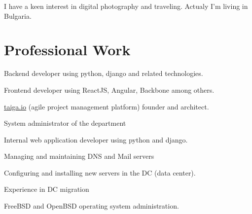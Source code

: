 \documentclass[letterpaper]{cv} %
\begin{document}
\sectionspace

I have a keen interest in digital photography and traveling. Actualy I'm
living in Bulgaria.


\sectionspace

\section{Professional Work}
\sectionspace


\vspace{\topsep} %
\begin{tightitemize}
\item Backend developer using python, django and related technologies.
\item Frontend developer using ReactJS, Angular, Backbone among others.
\item \href{https://taiga.io}{taiga.io} (agile project management platform)
  founder and architect.
\end{tightitemize}

\sectionspace



\begin{tightitemize}
\item System administrator of the department
\item Internal web application developer using python and django.
\end{tightitemize}

\sectionspace



\begin{tightitemize}
\item Managing and maintaining DNS and Mail servers
\item Configuring and installing new servers in the DC (data center).
\item Experience in DC migration
\item FreeBSD and OpenBSD operating system administration.
\end{tightitemize}
\end{document}
